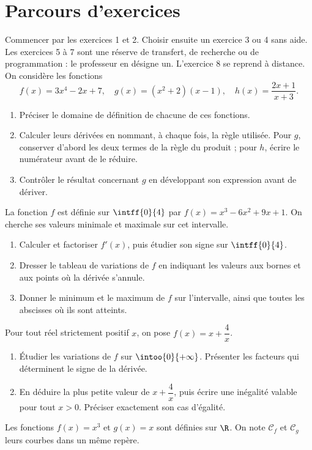 \section*{Parcours d’exercices}\label{C06-PARC}
Commencer par les exercices 1 et 2. Choisir ensuite un exercice 3 ou 4 sans aide. Les exercices 5 à 7 sont une réserve de transfert, de recherche ou de programmation : le professeur en désigne un. L’exercice 8 se reprend à distance.
\begingroup
{}
On considère les fonctions\[f(x)=3x^4-2x+7,\quad g(x)=(x^2+2)(x-1),\quad h(x)=\dfrac{2x+1}{x+3}.\]
\begin{enumerate}[label=\arabic*.]
\item Préciser le domaine de définition de chacune de ces fonctions.
\item Calculer leurs dérivées en nommant, à chaque fois, la règle utilisée. Pour $g$, conserver d’abord les deux termes de la règle du produit ; pour $h$, écrire le numérateur avant de le réduire.
\item Contrôler le résultat concernant $g$ en développant son expression avant de dériver.
\end{enumerate}
La fonction $f$ est définie sur $\intff{0}{4}$ par $f(x)=x^3-6x^2+9x+1$. On cherche ses valeurs minimale et maximale sur cet intervalle.
\begin{enumerate}[label=\arabic*.]
\item Calculer et factoriser $f\prime(x)$, puis étudier son signe sur $\intff{0}{4}$.
\item Dresser le tableau de variations de $f$ en indiquant les valeurs aux bornes et aux points où la dérivée s’annule.
\item Donner le minimum et le maximum de $f$ sur l’intervalle, ainsi que toutes les abscisses où ils sont atteints.
\end{enumerate}
Pour tout réel strictement positif $x$, on pose $f(x)=x+\dfrac4x$.
\begin{enumerate}[label=\arabic*.]
\item Étudier les variations de $f$ sur $\intoo{0}{+\infty}$. Présenter les facteurs qui déterminent le signe de la dérivée.
\item En déduire la plus petite valeur de $x+\dfrac4x$, puis écrire une inégalité valable pour tout $x>0$. Préciser exactement son cas d’égalité.
\end{enumerate}
Les fonctions $f(x)=x^3$ et $g(x)=x$ sont définies sur $\R$. On note $\mathcal C_f$ et $\mathcal C_g$ leurs courbes dans un même repère.
